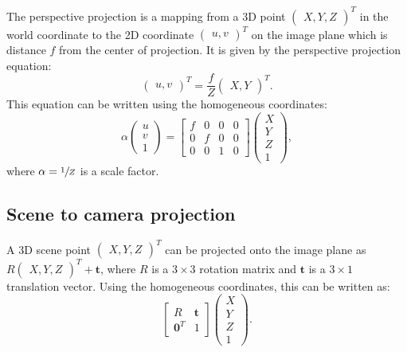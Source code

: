 The perspective projection is a mapping from a 3D point \(\begin{pmatrix}
	X, Y, Z
\end{pmatrix}^{T}\)
in the world coordinate
to the 2D coordinate \(\begin{pmatrix}
	u, v
\end{pmatrix}^{T}\)
on the image plane which is distance \(f\) from the center
of projection. It is given by the perspective projection equation:
\[
	\begin{pmatrix}
		u, v
	\end{pmatrix}^{T} = \frac{f}{Z} \begin{pmatrix}
		X, Y
	\end{pmatrix}^{T}.
\]
This equation can be written using the homogeneous coordinates:
\begin{equation} \label{eq:perspective_projection}
	\alpha \begin{pmatrix}
		u \\ v \\ 1
	\end{pmatrix} = \begin{bmatrix}
		f & 0 & 0 & 0 \\
		0 & f & 0 & 0 \\
		0 & 0 & 1 & 0
	\end{bmatrix} \begin{pmatrix}
		X \\ Y \\ Z \\ 1
	\end{pmatrix},
\end{equation}
where \(\alpha = \sfrac{1}{Z}\) is a scale factor.

\subsection{Scene to camera projection}\label{sub:scene_to_camera_projection}

A 3D scene point \(\begin{pmatrix}
	X, Y, Z
\end{pmatrix}^{T}\) can be projected onto the image plane as
\(R \begin{pmatrix}
	X, Y, Z
\end{pmatrix}^{T} + \mathbf{t}\), where \(R\) is a \(3 \times 3\) rotation matrix
and \(\mathbf{t}\) is
a \(3 \times 1\) translation vector. Using the homogeneous coordinates, this
can be written as:
\begin{equation}
	\begin{bmatrix}
		R              & \mathbf{t} \\
		\mathbf{0}^{T} & 1
	\end{bmatrix} \begin{pmatrix}
		X \\ Y \\ Z \\ 1
	\end{pmatrix}.
\end{equation}

